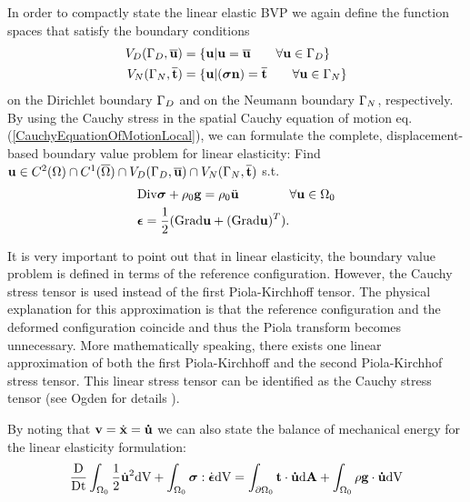 In order to compactly state the linear elastic BVP we again define the function spaces that satisfy the boundary conditions
\begin{alignat}{1}
V_D(\Gamma _D,\overline{\mathbf {u} }) &= \{ \mathbf {u}  | \mathbf {u}  = \overline{\mathbf {u} }  \qquad \forall \mathbf {u}  \in  \Gamma _D \} \label{FunctionSpaceDirichlet}\\ 
V_N(\Gamma _N,\overline{\mathbf {t} }) &= \{ \mathbf {u}  | (\boldsymbol{\sigma} \mathbf {n} ) = \overline{\mathbf {t} }  \qquad \forall \mathbf {u}  \in  \Gamma _N \} \label{FunctionSpaceNeumann}
\end{alignat}
on the Dirichlet boundary $\Gamma _D$ and on the Neumann boundary $\Gamma _N$, respectively. By using the Cauchy stress in the spatial Cauchy equation of motion eq. (\ref{CauchyEquationOfMotionLocal}), we can formulate the complete, displacement-based boundary value problem for linear elasticity: Find $\mathbf {u}  \in {C} ^{2}(\Omega) \cap {C} ^{1} (\overline{\Omega}) \cap V_D(\Gamma _D,\overline{\mathbf {u} }) \cap V_N(\Gamma _N,\overline{\mathbf {t} }) $ s.t.
\begin{alignat}{1}
&  \textnormal{Div}  \boldsymbol{\sigma}  +    \rho _0 \mathbf {g}    =  \rho _0 \ddot{\mathbf {u} } \qquad \qquad \forall \mathbf {u}  \in \Omega_0\\
&\boldsymbol{\epsilon} = \frac{1}{2} ( \textnormal{Grad} \mathbf {u}  + ( \textnormal{Grad} \mathbf {u} )^T).
\label{LinearElasticityFormulation}
\end{alignat}

It is very important to point out that in linear elasticity, the boundary value problem is defined in terms of the reference configuration. However, the Cauchy stress tensor is used instead of the first Piola-Kirchhoff tensor. The physical explanation for this approximation is that the reference configuration and the deformed configuration coincide and thus the Piola transform becomes unnecessary. More mathematically speaking, there exists one linear approximation of both the first Piola-Kirchhoff and the second Piola-Kirchhof stress tensor. This linear stress tensor can be identified as the Cauchy stress tensor (see Ogden for details \cite{Ogden1997}).

By noting that $\mathbf {v}  = \dot{\mathbf {x} } = \mathbf {\dot u}  $ we can also state the balance of mechanical energy for the linear elasticity formulation:
 \begin{equation}
    \frac{\textnormal{D}}{\textnormal{Dt}} \int_{ \Omega_0} \frac{1}{2}  \dot{\mathbf {u} }^2  \textnormal{dV} +   \int_{ \Omega_0} \boldsymbol{\sigma} : \dot{\boldsymbol{\epsilon}}   \textnormal{dV}     =  \int_{ \partial \Omega_0} \mathbf {t}  \cdot \mathbf {\dot u}     \textnormal{d}\mathbf{A} +  \int_{ \Omega_0} \rho \mathbf {g}  \cdot \mathbf {\dot u}   \textnormal{dV}
\label{MechEnergyBalanceLinear}
\end{equation}
 

 